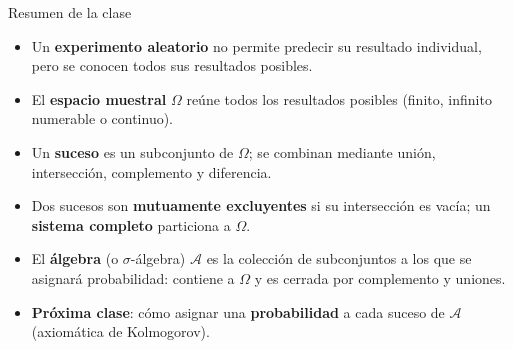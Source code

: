 \documentclass[aspectratio=169,11pt]{beamer}
\begin{document}
\begin{frame}{Resumen de la clase}
\begin{itemize}\small
\item Un \textbf{experimento aleatorio} no permite predecir su resultado individual, pero se conocen todos sus resultados posibles.
\item El \textbf{espacio muestral} $\Omega$ reúne todos los resultados posibles (finito, infinito numerable o continuo).
\item Un \textbf{suceso} es un subconjunto de $\Omega$; se combinan mediante unión, intersección, complemento y diferencia.
\item Dos sucesos son \textbf{mutuamente excluyentes} si su intersección es vacía; un \textbf{sistema completo} particiona a $\Omega$.
\item El \textbf{álgebra} (o $\sigma$-álgebra) $\mathcal{A}$ es la colección de subconjuntos a los que se asignará probabilidad: contiene a $\Omega$ y es cerrada por complemento y uniones.
\item \textbf{Próxima clase}: cómo asignar una \textbf{probabilidad} a cada suceso de $\mathcal{A}$ (axiomática de Kolmogorov).
\end{itemize}
\end{frame}
\end{document}
